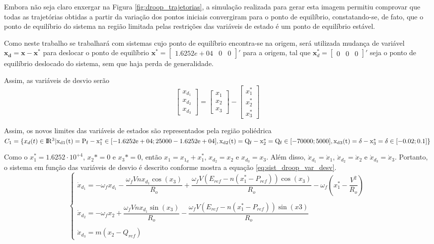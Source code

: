 Embora não seja claro enxergar na Figura \ref{fig:droop_trajetorias}, a simulação realizada para gerar esta imagem permitiu comprovar que todas as trajetórias obtidas a partir da variação dos pontos iniciais convergiram para o ponto de equilíbrio, constatando-se, de fato, que o ponto de equilíbrio  do sistema na região limitada pelas restrições das variáveis de estado é um ponto de equilíbrio estável.

Como neste trabalho se trabalhará com sistemas cujo ponto de equilíbrio encontra-se na origem, será utilizada mudança de variável $\mathbf{x_d = x - x^*}$ para deslocar o ponto de equilíbrio $\textbf{x}^* = \begin{bmatrix}1.6252e+04&0&0\end{bmatrix}'$ para a origem, tal que $\textbf{x}_d^* = \begin{bmatrix}0&0&0\end{bmatrix}'$ seja o ponto de equilíbrio deslocado do sistema, sem que haja perda de generalidade.

Assim, as variáveis de desvio serão
\begin{equation*}
\begin{bmatrix}x_{d_1}\\x _{d_2}\\x_{d_3}\end{bmatrix} = \begin{bmatrix}x_1\\x_2\\x_3\end{bmatrix} - \begin{bmatrix}x_1^*\\x_2^*\\x_3^*\end{bmatrix}
\end{equation*}

Assim, os novos limites das variáveis de estados são representados pela região poliédrica $C_1 = \{x_d(t) \in \rm I\!R^3 | x_{d1}(t) = P_f - x_1^* \in [-1.6252e+04; 25000 - 1.6252e+04], x_{d2}(t) = Q_f - x_2^* = Q_f \in [-70000; 5000], x_{d3}(t) = \delta -  x_3^* = \delta \in [-0.02; 0.1]\}$

Como o $x_1^* = 1.6252 \cdot10^{+4}$, $x_2* = 0$ e $x_3* = 0$, então $x_1 = x_{1_d} + x_1^*$, $x_{d_2} = x_2$ e $x_{d_3} = x_3$. Além disso, $\dot{x}_{d_1} = \dot{x}_1$, $\dot{x}_{d_2} = \dot{x}_2$ e $\dot{x}_{d_3} = \dot{x}_3$. Portanto, o sistema em função das variáveis de desvio é descrito conforme mostra a equação \ref{eq:sist_droop_var_desv}.
\begin{equation}\label{eq:sist_droop_var_desv}
\begin{cases}\dot{x}_{d_1} = -\omega_f x_{d_1} - \dfrac{\omega_f Vnx_{d_1}\cos(x_3)}{R_o} + \dfrac{\omega_f V(E_{ref} - n(x_1^* - P_{ref}))\cos(x_3)}{R_o} - \omega_f(x_1^* - \dfrac{V^2}{R_o})\\
\\\dot{x}_{d_2} = - \omega_fx_2 + \dfrac{\omega_fVnx_{d_1}\sin(x_3)}{R_o} - \dfrac{\omega_fV(E_{ref} - n(x_1^* - P_{ref}))\sin(x3)}{R_o}\\
\\\dot{x}_{d_3} = m(x_2 - Q_{ref})\end{cases}
\end{equation}

